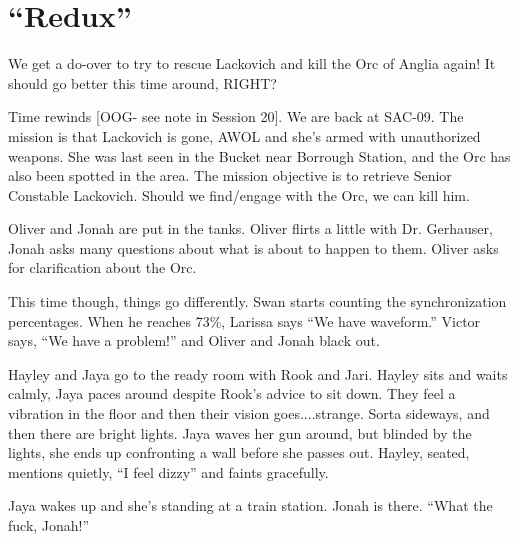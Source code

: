 \setcounter{chapter}{ 20 }
\chapter{\textbf{``Redux''} }










We get a do-over to try to rescue Lackovich and kill the Orc of Anglia again!   It should go better this time around, RIGHT?






Time rewinds {[}OOG- see note in Session 20{]}.  We are back at SAC-09.  The mission is that Lackovich is gone, AWOL and she's armed with unauthorized weapons.  She was last seen in the Bucket near Borrough Station, and the Orc has also been spotted in the area.  The mission objective is to retrieve Senior Constable Lackovich.  Should we find/engage with the Orc, we can kill him. 



Oliver and Jonah are put in the tanks. Oliver flirts a little with Dr. Gerhauser, Jonah asks many questions about what is about to happen to them.  Oliver asks for clarification about the Orc.  



This time though, things go differently.  Swan starts counting the synchronization percentages.  When he reaches 73\%, Larissa says ``We have waveform.''  Victor says, ``We have a problem!'' and Oliver and Jonah black out.



Hayley and Jaya go to the ready room with Rook and Jari.  Hayley sits and waits calmly, Jaya paces around despite Rook's advice to sit down.  They feel a vibration in the floor and then their vision goes....strange. Sorta sideways, and then there are bright lights.  Jaya waves her gun around, but blinded by the lights, she ends up confronting a wall before she passes out.  Hayley, seated, mentions quietly, ``I feel dizzy'' and faints gracefully.



Jaya wakes up and she's standing at a train station.  Jonah is there.  ``What the fuck, Jonah!''

